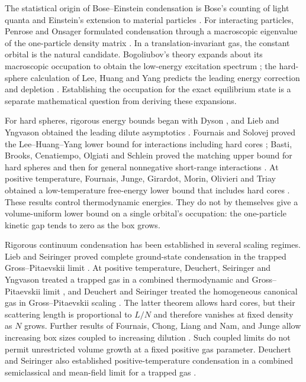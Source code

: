 
The statistical origin of Bose--Einstein condensation is Bose's counting of
light quanta and Einstein's extension to material particles
\citep{Bose1924,Einstein1924IdealGas,Einstein1925IdealGas}.
For interacting particles, Penrose and Onsager formulated condensation through
a macroscopic eigenvalue of the one-particle density matrix
\citep{PenroseOnsager1956}.  In a translation-invariant gas, the constant
orbital is the natural candidate.  Bogoliubov's theory expands about its
macroscopic occupation to obtain the low-energy excitation spectrum
\citep{Bogoliubov1947}; the hard-sphere calculation of Lee, Huang and Yang
predicts the leading energy correction and depletion
\citep{LeeHuangYang1957}.  Establishing the occupation for the exact equilibrium
state is a separate mathematical question from deriving these expansions.

For hard spheres, rigorous energy bounds began with Dyson
\citep{Dyson1957}, and Lieb and Yngvason obtained the leading dilute
asymptotics \citep{LiebYngvason1998}.  Fournais and Solovej proved the
Lee--Huang--Yang lower bound for interactions including hard cores
\citep{FournaisSolovej2023}; Basti, Brooks, Cenatiempo, Olgiati and Schlein
proved the matching upper bound for hard spheres and then for general
nonnegative short-range interactions
\citep{BastiEtAl2026HardSpheres,BastiEtAl2026GeneralPotentials}.
At positive temperature, Fournais, Junge, Girardot, Morin, Olivieri and Triay
obtained a low-temperature free-energy lower bound that includes hard cores
\citep{FournaisEtAl2026FreeEnergy}.  These results control thermodynamic
energies.  They do not by themselves give a volume-uniform lower bound on a
single orbital's occupation: the one-particle kinetic gap tends to zero as
the box grows.

Rigorous continuum condensation has been established in several scaling
regimes.  Lieb and Seiringer proved complete ground-state condensation in the
trapped Gross--Pitaevskii limit \citep{LiebSeiringer2002}.  At positive
temperature, Deuchert, Seiringer and Yngvason treated a trapped gas in a
combined thermodynamic and Gross--Pitaevskii limit
\citep{DeuchertSeiringerYngvason2019}, and Deuchert and Seiringer treated the
homogeneous canonical gas in Gross--Pitaevskii scaling
\citep{DeuchertSeiringer2020GP}.  The latter theorem allows hard cores, but
their scattering length is proportional to $L/N$ and therefore vanishes at
fixed density as $N$ grows.  Further results of Fournais, Chong, Liang and Nam,
and Junge allow increasing box sizes coupled to increasing dilution
\citep{Fournais2021,ChongLiangNam2026,Junge2026}.  Such coupled limits do not
permit unrestricted volume growth at a fixed positive gas parameter.
Deuchert and Seiringer also established positive-temperature condensation in
a combined semiclassical and mean-field limit for a trapped gas
\citep{DeuchertSeiringer2021MeanField}.


